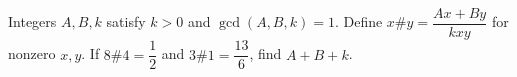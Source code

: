 Integers $A,B,k$ satisfy $k>0$ and $\gcd(A,B,k)=1$. Define $x\#y=\dfrac{Ax+By}{kxy}$ for nonzero $x,y$. If $8\#4=\dfrac{1}{2}$ and $3\#1=\dfrac{13}{6}$, find $A+B+k$.
